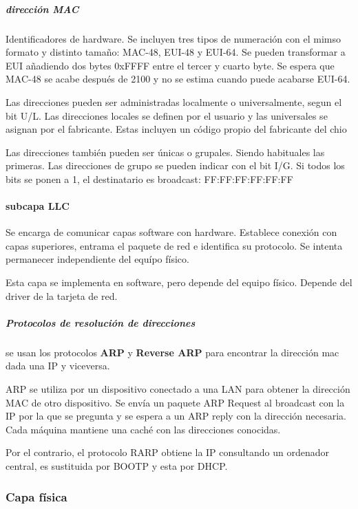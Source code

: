             \subparagraph{dirección MAC} %
                Identificadores de hardware. Se incluyen tres tipos de numeración con el mimso formato y distinto tamaño: MAC-48, EUI-48 y EUI-64. Se pueden transformar a EUI añadiendo dos bytes 0xFFFF entre el tercer y cuarto byte. Se espera que MAC-48 se acabe después de 2100 y no se estima cuando puede acabarse EUI-64.

                Las direcciones pueden ser administradas localmente o universalmente, segun el bit U/L. Las direcciones locales se definen por el usuario y las universales se asignan por el fabricante. Estas incluyen un código propio del fabricante del chio

                Las direcciones también pueden ser únicas o grupales. Siendo habituales las primeras. Las direcciones de grupo se pueden indicar con el bit I/G. Si todos los bits se ponen a 1, el destinatario es broadcast: FF:FF:FF:FF:FF:FF

        \paragraph{subcapa LLC} %
            Se encarga de comunicar capas software con hardware. Establece conexión con capas superiores, entrama el paquete de red e identifica su protocolo. Se intenta permanecer independiente del equípo físico.

            Esta capa se implementa en software, pero depende del equipo físico. Depende del driver de la tarjeta de red.

            \subparagraph{Protocolos de resolución de direcciones} %
                se usan los protocolos \textbf{ARP} y \textbf{Reverse ARP} para encontrar la dirección mac dada una IP y viceversa.

                ARP se utiliza por un dispositivo conectado a una LAN para obtener la dirección MAC de otro dispositivo. Se envía un paquete ARP Request al broadcast con la IP por la que se pregunta y se espera a un ARP reply con la dirección necesaria. Cada máquina mantiene una caché con las direcciones conocidas.

                Por el contrario, el protocolo RARP obtiene la IP consultando un ordenador central, es sustituida por BOOTP y esta por DHCP.

    \subsubsection{Capa física} %

